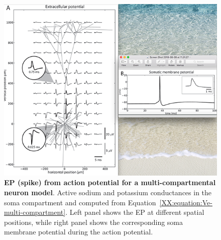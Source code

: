 \begin{figure}[!ht]
\begin{center}
\includegraphics{Figures/Spikes/Spikes-MultiCompartment-w100-r150}
\end{center}
\caption[]{\textbf{EP (spike) from action potential for a multi-compartmental neuron model}. Active sodium
and potassium conductances in the soma compartment and computed from 
Equation~\ref{XX:equation:Ve-multi-compartment}.
Left panel shows the EP at different spatial positions, while right panel shows the corresponding
soma membrane potential during the action potential. 
}
\label{Spikes:fig:MultiCompartment}
\end{figure}





